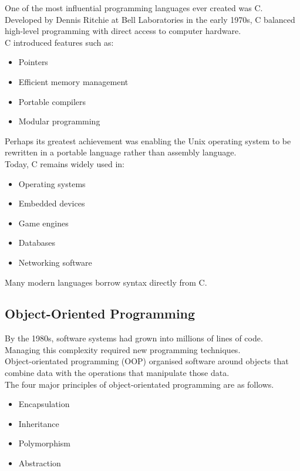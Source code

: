 One of the most influential programming languages ever created was C. Developed by Dennis Ritchie at Bell Laboratories in the early 1970s, C balanced high-level programming with direct access to computer hardware.\\

C introduced features such as:

\begin{itemize}
    \item Pointers
    \item Efficient memory management
    \item Portable compilers
    \item Modular programming
\end{itemize}

Perhaps its greatest achievement was enabling the Unix operating system to be rewritten in a portable language rather than assembly language.\\

Today, C remains widely used in:

\begin{itemize}
    \item Operating systems
    \item Embedded devices
    \item Game engines
    \item Databases
    \item Networking software
\end{itemize}

Many modern languages borrow syntax directly from C.

\subsection{Object-Oriented Programming}

By the 1980s, software systems had grown into millions of lines of code. Managing this complexity required new programming techniques.\\

Object-orientated programming (OOP) organised software around objects that combine data with the operations that manipulate those data.\\

The four major principles of object-orientated programming are as follows.

\begin{itemize}
    \item Encapsulation
    \item Inheritance
    \item Polymorphism
    \item Abstraction
\end{itemize}

